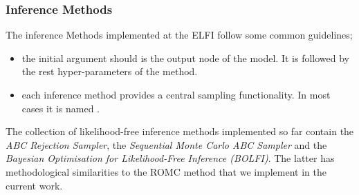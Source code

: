\subsubsection{Inference Methods}
\label{sec:inference-methods}

The inference Methods implemented at the ELFI follow some common
guidelines;

\begin{itemize}
\item the initial argument should is the output node of the model. It
  is followed by the rest hyper-parameters of the method.
\item each inference method provides a central sampling
  functionality. In most cases it is named
  .
\end{itemize}

The collection of likelihood-free inference methods implemented so far
contain the \textit{ABC Rejection Sampler}, the \textit{Sequential
  Monte Carlo ABC Sampler} and the \textit{Bayesian Optimisation for
  Likelihood-Free Inference (BOLFI)}. The latter has methodological
similarities to the ROMC method that we implement in the current work.
